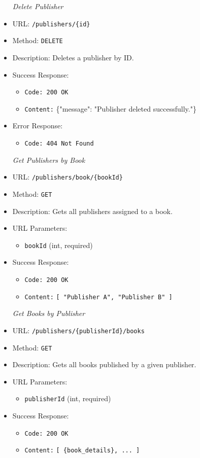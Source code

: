 \begin{itemize}
\item[\textit{Delete Publisher}]
\item URL: \texttt{/publishers/\{id\}}  
\item Method: \texttt{DELETE}  
\item Description: Deletes a publisher by ID.
\item Success Response:
\begin{itemize}
  \item \texttt{Code: 200 OK}
  \item \texttt{Content:} \{"message": "Publisher deleted successfully."\}
\end{itemize}
\item Error Response:
\begin{itemize}
  \item \texttt{Code: 404 Not Found}
\end{itemize}


\item[\textit{Get Publishers by Book}]
\item URL: \texttt{/publishers/book/\{bookId\}}  
\item Method: \texttt{GET}  
\item Description: Gets all publishers assigned to a book.
\item URL Parameters:
\begin{itemize}
  \item \texttt{bookId} (int, required)
\end{itemize}
\item Success Response:
\begin{itemize}
  \item \texttt{Code: 200 OK}
  \item \texttt{Content:} \texttt{[ "Publisher A", "Publisher B" ]}
\end{itemize}


\item[\textit{Get Books by Publisher}] 
\item URL: \texttt{/publishers/\{publisherId\}/books}  
\item Method: \texttt{GET}  
\item Description: Gets all books published by a given publisher.
\item URL Parameters:
\begin{itemize}
  \item \texttt{publisherId} (int, required)
\end{itemize}
\item Success Response:
\begin{itemize}
  \item \texttt{Code: 200 OK}
  \item \texttt{Content:} \texttt{[ \{book\_details\}, ... ]}
\end{itemize}



\end{itemize}
